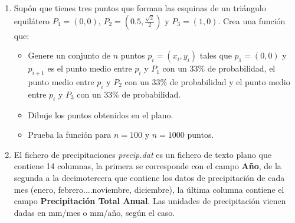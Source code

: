 \begin{enumerate}
\item Supón que tienes tres puntos que forman las esquinas de un triángulo equilátero $P_1=(0,0)$, $P_2=(0.5,\frac{\sqrt{2}}{2})$ y $P_3=(1,0)$. Crea una función que:
\begin{itemize}
    \item Genere un conjunto de $n$ puntos $p_i=(x_i,y_i)$ tales que $p_1=(0,0)$ y $p_{i+1}$  es el punto medio entre $p_i$ y $P_1$ con un $33\%$ de probabilidad, el punto medio entre  $p_i$ y $P_2$ con un $33\%$ de probabilidad y  el punto medio entre $p_i$ y $P_3$ con un $33\%$ de probabilidad.
    \item Dibuje los puntos obtenidos en el plano.
    \item Prueba la función para $n=100$ y  $n=1000$ puntos.
\end{itemize}
\item El fichero de precipitaciones \textit{precip.dat} es un fichero de texto plano que contiene 14 columnas, la primera se corresponde con el campo \textbf{Año}, de la segunda a la decimotercera que contiene los datos de precipitación de cada mes (enero, febrero....noviembre, diciembre), la última columna contiene el campo \textbf{Precipitación Total Anual}. Las unidades de precipitación vienen dadas en mm/mes o mm/año, según el caso.


\end{enumerate}
